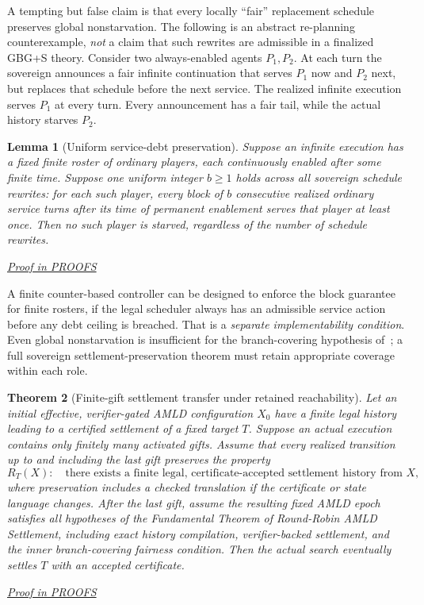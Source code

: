 \documentclass[11pt,letterpaper]{article}
\newtheorem{theorem}{Theorem}[section]
\newtheorem{lemma}[theorem]{Lemma}
\theoremstyle{definition}\newtheorem{definition}[theorem]{Definition}\newtheorem{example}[theorem]{Example}
\theoremstyle{remark}\newtheorem{remark}[theorem]{Remark}
\newcommand{\prooflink}[1]{\par\noindent\hfill\small\hyperref[#1]{\textit{Proof in PROOFS}}\normalsize}
\begin{document}
A tempting but false claim is that every locally ``fair'' replacement schedule preserves global nonstarvation. The following is an abstract re-planning counterexample, \emph{not} a claim that such rewrites are admissible in a finalized GBG+S theory. Consider two always-enabled agents $P_1,P_2$. At each turn the sovereign announces a fair infinite continuation that serves $P_1$ now and $P_2$ next, but replaces that schedule before the next service. The realized infinite execution serves $P_1$ at every turn. Every announcement has a fair tail, while the actual history starves $P_2$.

\begin{lemma}[Uniform service-debt preservation]\label{mvsi:lem:debt}
Suppose an infinite execution has a fixed finite roster of ordinary players, each continuously enabled after some finite time. Suppose one uniform integer $b\ge 1$ holds across \emph{all} sovereign schedule rewrites: for each such player, every block of $b$ consecutive \emph{realized} ordinary service turns after its time of permanent enablement serves that player at least once. Then no such player is starved, regardless of the number of schedule rewrites.
\end{lemma}
\label{br:mvsi:stmt:3}\prooflink{br:mvsi:proof:3}


A finite counter-based controller can be designed to enforce the block guarantee for finite rosters, if the legal scheduler always has an admissible service action before any debt ceiling is breached. That is a \emph{separate implementability condition}. Even global nonstarvation is insufficient for the branch-covering hypothesis of~\cite{mvsi:RoundRobin}; a full sovereign settlement-preservation theorem must retain appropriate coverage within each role.

\begin{theorem}[Finite-gift settlement transfer under retained reachability]\label{mvsi:thm:settlement}
Let an initial effective, verifier-gated AMLD configuration $X_0$ have a finite legal history leading to a certified settlement of a fixed target $T$. Suppose an actual execution contains only finitely many activated gifts. Assume that every realized transition up to and including the last gift preserves the property
\[
R_T(X):\quad \text{there exists a finite legal, certificate-accepted settlement history from $X$},
\]
where preservation includes a checked translation if the certificate or state language changes. After the last gift, assume the resulting fixed AMLD epoch satisfies all hypotheses of the Fundamental Theorem of Round-Robin AMLD Settlement, including exact history compilation, verifier-backed settlement, and the \emph{inner} branch-covering fairness condition. Then the actual search eventually settles $T$ with an accepted certificate.
\end{theorem}
\label{br:mvsi:stmt:4}\prooflink{br:mvsi:proof:4}
\end{document}
